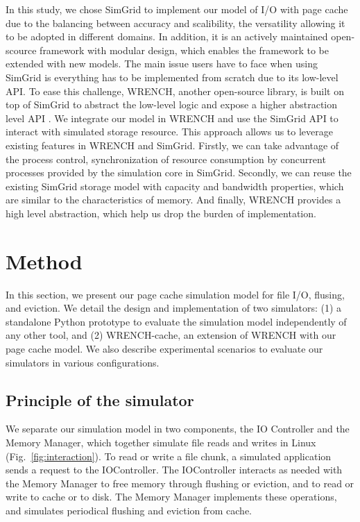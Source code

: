 \documentclass[conference]{IEEEtran}
\begin{document}
            In this study, we chose SimGrid to implement our model of I/O with page cache 
            due to the balancing between accuracy and scalibility, the versatility allowing it 
            to be adopted in different domains. 
            In addition, it is an actively maintained open-scource framework with 
            modular design, which enables the framework to be extended with new models. 
            The main issue users have to face when using SimGrid is everything has to be 
            implemented from scratch due to its low-level API. 
            To ease this challenge, WRENCH, another open-source library, is built on top 
            of SimGrid to abstract the low-level logic and expose a higher abstraction 
            level API \cite{casanova2018wrench}. 
            We integrate our model in WRENCH and use the SimGrid API to interact with 
            simulated storage resource.
            This approach allows us to leverage existing features in WRENCH and SimGrid.
            Firstly, we can take advantage of the process control, synchronization of 
            resource consumption by concurrent processes provided by the simulation core 
            in SimGrid. 
            Secondly, we can reuse the existing SimGrid storage model with capacity 
            and bandwidth properties, which are similar to the characteristics of memory.
            And finally, WRENCH provides a high level abstraction, which help us drop 
            the burden of implementation. 
            
    \section{Method}
    \label{method}    

        In this section, we present our page cache simulation model for file I/O,
        flusing, and eviction. We detail the design and implementation of two simulators:
        (1) a standalone Python prototype to evaluate the simulation model independently of any other 
        tool, and (2) WRENCH-cache, an extension of WRENCH with our page cache model.
        We also describe experimental scenarios to evaluate our simulators in various configurations.

        \subsection{Principle of the simulator}
    
            We separate our simulation model in two components, the IO
            Controller and the Memory Manager, which together simulate 
            file reads and writes in Linux (Fig.~\ref{fig:interaction}). 
            To read or write a file chunk, a simulated application sends a
            request to the IOController. The IOController interacts as needed with
            the Memory Manager to free memory through flushing or eviction,
            and to read or write to cache or to disk. The Memory Manager
            implements these operations, and simulates periodical flushing
            and eviction from cache.
\end{document}
